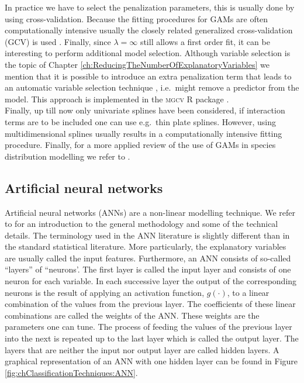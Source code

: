 In practice we have to select the penalization parameters, this is usually done by using cross-validation. Because the fitting procedures for GAMs are often computationally intensive usually the closely related generalized cross-validation (GCV) is used \parencite{wood_gams_2002}. Finally, since $\lambda = \infty$ still allows a first order fit, it can be interesting to perform additional model selection. Although variable selection is the topic of Chapter \ref{ch:ReducingTheNumberOfExplanatoryVariables} we mention that it is possible to introduce an extra penalization term that leads to an automatic variable selection technique \parencite{marra_practical_2011}, i.e.\ might remove a predictor from the model. This approach is implemented in the \textsc{mgcv} R package \parencite{mgcv}. \\

Finally, up till now only univariate splines have been considered, if interaction terms are to be included one can use e.g.\ thin plate splines. However, using multidimensional splines usually results in a computationally intensive fitting procedure. Finally, for a more applied review of the use of GAMs in species distribution modelling we refer to \cite{guisan_generalized_2002}.

\subsection{Artificial neural networks}
Artificial neural networks (ANNs) are a non-linear modelling technique. We refer to \cite{bishop_neural_1995} for an introduction to the general methodology and some of the technical details. The terminology used in the ANN literature is slightly different than in the standard statistical literature. More particularly, the explanatory variables are usually called the input features. Furthermore, an ANN consists of so-called ``layers'' of ``neurons'. The first layer is called the input layer and consists of one neuron for each variable. In each successive layer the output of the corresponding neurons is the result of applying an activation function, $g(\cdot)$, to a linear combination of the values from the previous layer. The coefficients of these linear combinations are called the weights of the ANN. These weights are the parameters one can tune. The process of feeding the values of the previous layer into the next is repeated up to the last layer which is called the output layer. The layers that are neither the input nor output layer are called hidden layers. A graphical representation of an ANN with one hidden layer can be found in Figure \ref{fig:chClassificationTechniques:ANN}.\\

